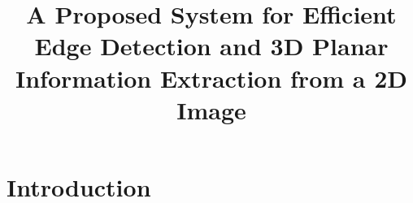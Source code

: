 \documentclass[preprint,12pt]{elsarticle}
\newenvironment{changemargin}[2]{%
\begin{list}{}{%
\setlength{\topsep}{0pt}%
\setlength{\leftmargin}{#1}%
\setlength{\rightmargin}{#2}%
\setlength{\listparindent}{\parindent}%
\setlength{\itemindent}{\parindent}%
\setlength{\parsep}{\parskip}%
}%
\item[]}{\end{list}}
\begin{document}
\begin{frontmatter}


\title{A Proposed System for Efficient Edge Detection and 3D Planar Information Extraction from a 2D Image}




\author{}
\author{}

\address{Horace Mann School, Bronx, New York}

\begin{abstract}

\end{abstract}





\end{frontmatter}
\pagebreak

\tableofcontents



\section{Introduction}
\label{S:1}

\end{document}

